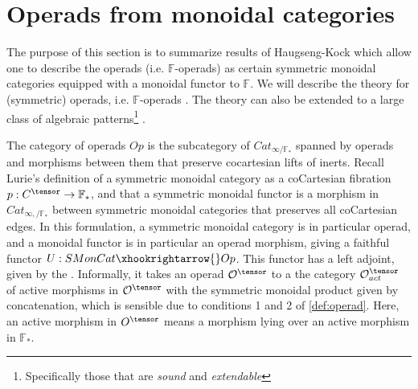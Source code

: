 \section{Operads from monoidal categories}
\label{sec:envelope}
The purpose of this section is to summarize results of Haugseng-Kock which allow one to describe the operads (i.e. $\mathbb{F}$-operads) as certain symmetric monoidal categories equipped with a monoidal functor to $\mathbb{F}$. We will describe the theory for (symmetric) operads, i.e. $\mathbb{F}$-operads \cite{HaugsengKock}. The theory can also be extended to a large class of algebraic patterns\footnote{Specifically those that are \textit{sound} and \textit{extendable}} \cite{Barkan-Haugseng-Steinebrunner}.

The category of operads $Op$ is the subcategory of $Cat_{\infty/\mathbb{F}_*}$ spanned by operads and morphisms between them that preserve cocartesian lifts of inerts. Recall Lurie's definition of a symmetric monoidal category as a coCartesian fibration $p:C^{\tensor}\rightarrow \mathbb{F}_*$, and that a symmetric monoidal functor is a morphism in $Cat_{\infty,/\mathbb{F}_*}$ between symmetric monoidal categories that preserves all coCartesian edges. In this formulation, a symmetric monoidal category is in particular operad, and a monoidal functor is in particular an operad morphism, giving a faithful functor $U: SMonCat\xhookrightarrow{} Op$. This functor has a left adjoint, given by the . Informally, it takes an operad $\mathcal{O}^\tensor$ to a the category $\mathcal{O}^\tensor_{act}$ of active morphisms in $\mathcal{O}^\tensor$ with the symmetric monoidal product given by concatenation, which is sensible due to conditions 1 and 2 of \cref{def:operad}. Here, an active morphism in $O^\tensor$ means a morphism lying over an active morphism in $\mathbb{F}_*$.

